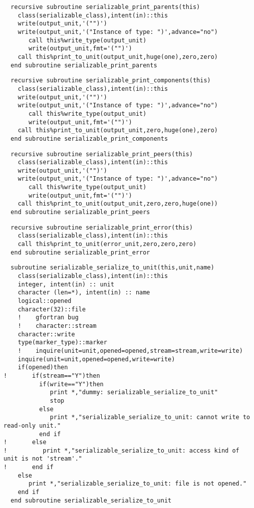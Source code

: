 \begin{Verbatim}
  recursive subroutine serializable_print_parents(this)
    class(serializable_class),intent(in)::this
    write(output_unit,'("")')
    write(output_unit,'("Instance of type: ")',advance="no")
       call this%write_type(output_unit)
       write(output_unit,fmt='("")')
    call this%print_to_unit(output_unit,huge(one),zero,zero)
  end subroutine serializable_print_parents
\end{Verbatim}

\begin{Verbatim}
  recursive subroutine serializable_print_components(this)
    class(serializable_class),intent(in)::this
    write(output_unit,'("")')
    write(output_unit,'("Instance of type: ")',advance="no")
       call this%write_type(output_unit)
       write(output_unit,fmt='("")')
    call this%print_to_unit(output_unit,zero,huge(one),zero)
  end subroutine serializable_print_components
\end{Verbatim}

\begin{Verbatim}
  recursive subroutine serializable_print_peers(this)
    class(serializable_class),intent(in)::this
    write(output_unit,'("")')
    write(output_unit,'("Instance of type: ")',advance="no")
       call this%write_type(output_unit)
       write(output_unit,fmt='("")')
    call this%print_to_unit(output_unit,zero,zero,huge(one))
  end subroutine serializable_print_peers
\end{Verbatim}

\begin{Verbatim}
  recursive subroutine serializable_print_error(this)
    class(serializable_class),intent(in)::this
    call this%print_to_unit(error_unit,zero,zero,zero)
  end subroutine serializable_print_error
\end{Verbatim}

\begin{Verbatim}
  subroutine serializable_serialize_to_unit(this,unit,name)
    class(serializable_class),intent(in)::this
    integer, intent(in) :: unit
    character (len=*), intent(in) :: name
    logical::opened
    character(32)::file
    !    gfortran bug
    !    character::stream
    character::write
    type(marker_type)::marker
    !    inquire(unit=unit,opened=opened,stream=stream,write=write)
    inquire(unit=unit,opened=opened,write=write)
    if(opened)then
!       if(stream=="Y")then
          if(write=="Y")then
             print *,"dummy: serializable_serialize_to_unit"
             stop
          else
             print *,"serializable_serialize_to_unit: cannot write to read-only unit."
          end if
!       else
!          print *,"serializable_serialize_to_unit: access kind of unit is not 'stream'."
!       end if
    else
       print *,"serializable_serialize_to_unit: file is not opened."
    end if
  end subroutine serializable_serialize_to_unit
\end{Verbatim}


